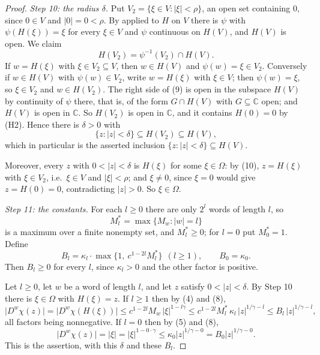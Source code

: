 \begin{proof}
\emph{Step 10: the radius $\delta$.}  Put $V_2=\{\xi\in V:|\xi|<\rho\}$, an
open set containing $0$, since $0\in V$ and $|0|=0<\rho$.  By
 applied to $H$ on $V$ there is $\psi$ with
$\psi(H(\xi))=\xi$ for every $\xi\in V$ and $\psi$ continuous on $H(V)$, and
$H(V)$ is open.  We claim
\begin{equation}\tag{9}
  H(V_2)=\psi^{-1}(V_2)\cap H(V).
\end{equation}
If $w=H(\xi)$ with $\xi\in V_2\subseteq V$, then $w\in H(V)$ and
$\psi(w)=\xi\in V_2$.  Conversely if $w\in H(V)$ with $\psi(w)\in V_2$, write
$w=H(\xi)$ with $\xi\in V$; then $\psi(w)=\xi$, so $\xi\in V_2$ and
$w\in H(V_2)$.  The right side of (9) is open in the subspace $H(V)$ by
continuity of $\psi$ there, that is, of the form $G\cap H(V)$ with
$G\subseteq\mathbb{C}$ open; and $H(V)$ is open in $\mathbb{C}$.  So $H(V_2)$
is open in $\mathbb{C}$, and it contains $H(0)=0$ by (H2).  Hence there is
$\delta>0$ with
\begin{equation}\tag{10}
  \{z:|z|<\delta\}\subseteq H(V_2)\subseteq H(V),
\end{equation}
which in particular is the asserted inclusion
$\{z:|z|<\delta\}\subseteq H(V)$.

Moreover, every $z$ with $0<|z|<\delta$ is $H(\xi)$ for some $\xi\in\Omega$:
by (10), $z=H(\xi)$ with $\xi\in V_2$, i.e.\ $\xi\in V$ and $|\xi|<\rho$; and
$\xi\neq0$, since $\xi=0$ would give $z=H(0)=0$, contradicting $|z|>0$.  So
$\xi\in\Omega$.

\emph{Step 11: the constants.}  For each $l\ge0$ there are only $2^{l}$ words
of length $l$, so
\[
  M_l^{\ast}=\max\bigl\{M_w:|w|=l\bigr\}
\]
is a maximum over a finite nonempty set, and $M_l^{\ast}\ge0$; for $l=0$ put
$M_0^{\ast}=1$.  Define
\[
  B_l=\kappa_l\cdot\max\bigl\{1,\ c^{1-2l}M_l^{\ast}\bigr\}\ \ (l\ge1),
  \qquad B_0=\kappa_0 .
\]
Then $B_l\ge0$ for every $l$, since $\kappa_l>0$ and the other factor is
positive.

Let $l\ge0$, let $w$ be a word of length $l$, and let $z$ satisfy
$0<|z|<\delta$.  By Step 10 there is $\xi\in\Omega$ with $H(\xi)=z$.  If
$l\ge1$ then by (4) and (8),
\[
  \bigl|D^{w}\chi(z)\bigr|=\bigl|D^{w}\chi(H(\xi))\bigr|
  \le c^{1-2l}M_w\,|\xi|^{1-l\gamma}
  \le c^{1-2l}M_l^{\ast}\,\kappa_l\,|z|^{1/\gamma-l}
  \le B_l\,|z|^{1/\gamma-l},
\]
all factors being nonnegative.  If $l=0$ then by (5) and (8),
\[
  \bigl|D^{w}\chi(z)\bigr|=|\xi|=|\xi|^{1-0\cdot\gamma}
  \le\kappa_0|z|^{1/\gamma-0}=B_0|z|^{1/\gamma-0}.
\]
This is the assertion, with this $\delta$ and these $B_l$.
\end{proof}
